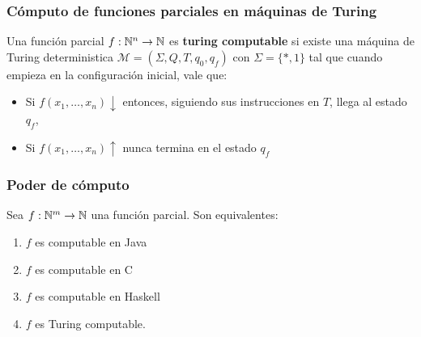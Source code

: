 	
	\subsubsection{Cómputo de funciones parciales en máquinas de Turing}
	Una función parcial $f:\mathbb{N}^n\to\mathbb{N}$ es \textbf{turing computable} si existe una máquina de Turing deterministica $\mathcal{M}=(\Sigma, Q, T, q_0, q_f)$ con $\Sigma=\{*,1\}$ tal que cuando empieza en la configuración inicial, vale que:
	
	\begin{itemize}
		\item Si $f(x_1,\dots, x_n)\downarrow$ entonces, siguiendo sus instrucciones en $T$, llega al estado $q_f$,
		\item  Si $f(x_1,\dots, x_n)\uparrow$ nunca termina en el estado $q_f$
	\end{itemize}
	

	
	\subsubsection{Poder de  cómputo}
	
	Sea $f:\mathbb{N}^m\to\mathbb{N}$ una función parcial. Son equivalentes:
	\begin{multicols}{2}
	\begin{enumerate}
	\item $f$ es computable en Java
	\item $f$ es computable en C
	\item $f$ es computable en Haskell
	\item $f$ es Turing computable.
\end{enumerate}
	\end{multicols}
	
